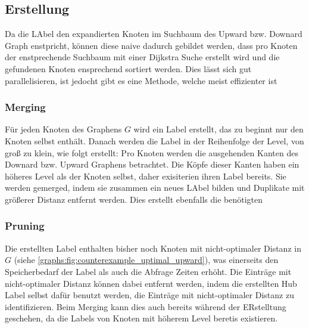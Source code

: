 \subsection{Erstellung}

Da die LAbel den expandierten Knoten im Suchbaum des Upward bzw. Downard Graph enstpricht, können diese naive dadurch gebildet werden, dass pro Knoten der enstprechende Suchbaum mit einer Dijkstra Suche erstellt wird und die gefundenen Knoten ensprechend sortiert werden.
Dies lässt sich gut parallelisieren, ist jedocht gibt es eine Methode, welche meist effizienter ist

\subsubsection{Merging}

Für jeden Knoten des Graphens $G$ wird ein Label erstellt, das zu beginnt nur den Knoten selbst enthält.
Danach werden die Label in der Reihenfolge der Level, von groß zu klein, wie folgt erstellt:
Pro Knoten werden die ausgehenden Kanten des Downard bzw. Upward Graphens betrachtet.
Die Köpfe dieser Kanten haben ein höheres Level als der Knoten selbst, daher exisiterien ihren Label bereits.
Sie werden gemerged, indem sie zusammen ein neues LAbel bilden und Duplikate mit größerer Distanz entfernt werden.
Dies erstellt ebenfalls die benötigten

\subsubsection{Pruning}

Die erstellten Label enthalten bisher noch Knoten mit nicht-optimaler Distanz in $G$ (siehe \autoref{graphs:fig:counterexample_uptimal_upward}), was einerseits den Speicherbedarf der  Label als auch die Abfrage Zeiten erhöht.
Die Einträge mit nicht-optimaler Distanz können dabei entfernt werden, indem die erstellten Hub Label selbst dafür benutzt werden, die Einträge mit nicht-optimaler Distanz zu identifizieren.
Beim Merging kann dies auch bereits während der ERstelltung geschehen, da die Labels von Knoten mit höherem Level beretis existieren.